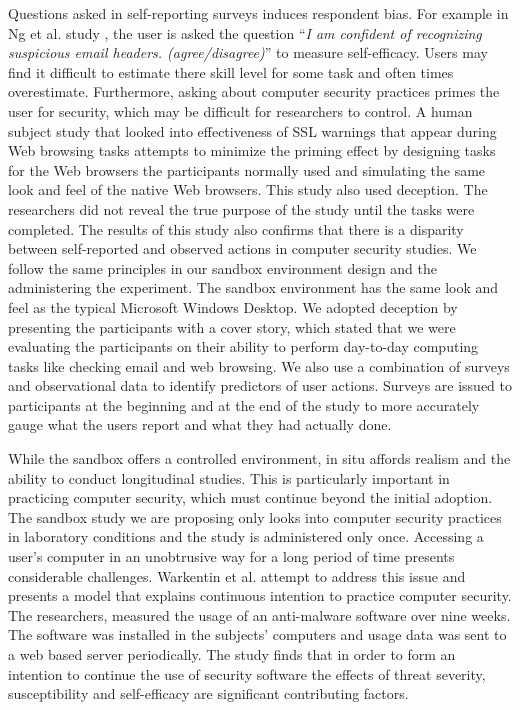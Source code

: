 Questions asked in self-reporting surveys induces respondent bias. For example in Ng et al. study \citeyear{ng2007}, the user is asked the question ``\textit{I am confident of recognizing suspicious email headers. (agree/disagree)}'' to measure self-efficacy. Users may find it difficult to estimate there skill level for some task and often times overestimate. Furthermore, asking about computer security practices primes the user for security, which may be difficult for researchers to control. A human subject study that looked into effectiveness of SSL warnings that appear during Web browsing tasks \cite{sotirakopoulos2011} attempts to minimize the priming effect by designing tasks for the Web browsers the participants normally used and simulating the same look and feel of the native Web browsers. This study also used deception. The researchers did not reveal the true purpose of the study until the tasks were completed. The results of this study also confirms that there is a disparity between self-reported  and observed actions in computer security studies. We follow the same principles in our sandbox environment design and the administering the experiment. The sandbox environment has the same look and feel as the typical Microsoft Windows Desktop. We adopted deception by presenting the participants with a cover story, which stated that we were evaluating the participants on their ability to perform day-to-day computing tasks like checking email and web browsing. We also use a combination of surveys and observational data to identify predictors of user actions. Surveys are issued to participants at the beginning and at the end of the study to more accurately gauge what the users report and what they had actually done.

While the sandbox offers a controlled environment, in situ affords realism and the ability to conduct longitudinal studies. This is particularly important in practicing computer security, which must continue beyond the initial adoption. The sandbox study we are proposing only looks into computer security practices in laboratory conditions and the study is administered only once. Accessing a user's computer in an unobtrusive way for a long period of time presents considerable challenges. Warkentin et al. \citeyear{warkentin2016} attempt to address this issue and presents a model that explains continuous intention to practice computer security. The researchers, measured the usage of an anti-malware software over nine weeks. The software was installed in the subjects' computers and usage data was sent to a web based server periodically. The study finds that in order to form an intention to continue the use of security software the effects of threat severity, susceptibility and self-efficacy are significant contributing factors.

